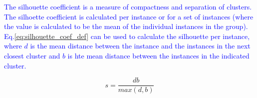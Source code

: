 \textcolor{blue}{The {silhouette coefficient} is a measure of compactness and separation of clusters. The silhoette coefficient is calculated per instance or for a set of instances (where the value is calculated to be the mean of the individual instances in the group). Eq.\ref{eq:silhouette_coef_def} can be used to calculate the silhouette per instance, where $d$ is the mean distance between the instance and the instances in the next closest cluster and $b$ is hte mean distance between the instances in the indicated cluster.}

\begin{equation}
{s = \frac{db}{max(d,b)}}
\label{eq:silhouette_coef_def}
\end{equation}





